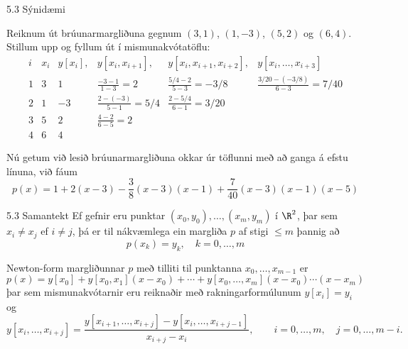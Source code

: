 \begin{frame}{5.3 Sýnidæmi}
 
Reiknum út brúunarmargliðuna gegnum $(3,1)$, $(1,-3)$, $(5,2)$ og
$(6,4)$. Stillum upp og fyllum út í mismunakvótatöflu: 
\begin{equation*}
  \begin{array}{cc||cccc}
    i & x_i & y[x_i], & y[x_i,x_{i+1}], &
    y[x_i,x_{i+1},x_{i+2}], & y[x_i,\ldots,x_{i+3}] \\
    \hline
    1 & 3 & 1 & \frac{-3-1}{1-3} = 2 & \frac{5/4-2}{5-3} = -3/8 &
    \frac{3/20-(-3/8)}{6-3} = 7/40 \\
    2 & 1 & -3 & \frac{2-(-3)}{5-1} = 5/4 &
    \frac{2-5/4}{6-1} = 3/20 & \\
    3 & 5 & 2 & \frac{4-2}{6-5} = 2 & & \\
    4 & 6 & 4 & & &
  \end{array}
\end{equation*}

\pause
Nú getum við lesið brúunarmargliðuna okkar úr töflunni með að ganga á
efstu línuna, við fáum 
\begin{equation*}
  p(x) = 1 + 2(x-3) - \frac 38 (x-3)(x-1)
  + \frac 7{40} (x-3)(x-1)(x-5)
\end{equation*}
\end{frame}

\begin{frame}{5.3 Samantekt} 
Ef gefnir eru punktar $(x_0,y_0), \ldots, (x_m,y_m)$ í $\R^2$,
þar sem $x_i\neq x_j$ ef $i\neq j$, þá er til nákvæmlega ein 
margliða $p$ af stigi $\leq m$ þannig að
$$
  p(x_k) = y_k, \quad k = 0, \ldots, m
$$

\pause
Newton-form margliðunnar $p$ með tilliti til punktanna
$x_0,\dots,x_{m-1}$ er
$$
p(x)=y[x_0]+y[x_0,x_1](x-x_0)+\cdots+y[x_0,\dots,x_m](x-x_0)\cdots(x-x_m)
$$
þar sem mismunakvótarnir eru reiknaðir með rakningarformúlunum
$y[x_i]=y_i$ og
$$
  y[x_i,\ldots,x_{i+j}]
  = \frac{y[x_{i+1},\ldots,x_{i+j}] - y[x_i,\ldots,x_{i+j-1}]}
  {x_{i+j} - x_i}, \qquad i=0,\dots,m, \quad j=0,\dots,m-i.
$$
\end{frame}

